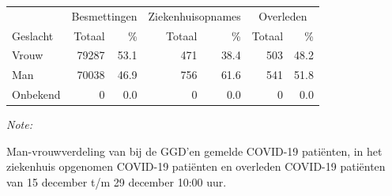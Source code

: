 \documentclass[
  english,
  man,floatsintext]{apa6}
\begin{document}
\begin{table}[H]
\centering\begingroup\fontsize{11}{13}\selectfont

\begin{threeparttable}
\begin{tabular}{lrrrrrr}
\toprule
\multicolumn{1}{c}{ } & \multicolumn{2}{c}{Besmettingen} & \multicolumn{2}{c}{Ziekenhuisopnames} & \multicolumn{2}{c}{Overleden} \\
\cmidrule(l{3pt}r{3pt}){2-3} \cmidrule(l{3pt}r{3pt}){4-5} \cmidrule(l{3pt}r{3pt}){6-7}
Geslacht & Totaal & \% & Totaal & \% & Totaal & \%\\
\midrule
Vrouw & 79287 & 53.1 & 471 & 38.4 & 503 & 48.2\\
Man & 70038 & 46.9 & 756 & 61.6 & 541 & 51.8\\
Onbekend & 0 & 0.0 & 0 & 0.0 & 0 & 0.0\\
\bottomrule
\end{tabular}
\begin{tablenotes}
\item \textit{Note: } 
\item Man-vrouwverdeling van bij de GGD’en gemelde COVID-19 patiënten, in het ziekenhuis opgenomen COVID-19 patiënten en overleden COVID-19 patiënten van 15 december t/m 29 december 10:00 uur.
\end{tablenotes}
\end{threeparttable}
\endgroup{}
\end{table}
\newpage
\end{document}

